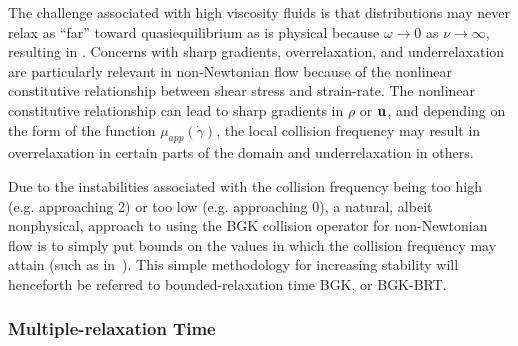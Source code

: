 The challenge associated with high viscosity fluids is that \DIFdelbegin {}\DIFdelend \DIFaddbegin {}\DIFaddend distributions may never relax as ``far'' toward quasiequilibrium as is physical because $\omega \rightarrow 0$ as $\nu \rightarrow \infty$, resulting in \DIFdelbegin {}\DIFdelend \DIFaddbegin {}\DIFaddend .
Concerns with sharp gradients, overrelaxation, and underrelaxation are particularly relevant in non-Newtonian flow because of the nonlinear constitutive relationship between shear stress and strain-rate.
The nonlinear constitutive relationship can lead to sharp gradients in $\rho$ or $\mathbf{u}$, and depending on the form of the function $\mu_{app}(\dot{\gamma})$, the local collision frequency may result in overrelaxation in certain parts of the domain and \DIFdelbegin {}\DIFdelend underrelaxation in others.

Due to the instabilities associated with the collision frequency being too high (e.g. approaching 2) or too low (e.g. approaching 0), a natural, albeit nonphysical, approach to using the BGK collision operator for non-Newtonian flow is to simply put bounds on the values in which the collision frequency may attain (such as in~\citet{svec2011flow,svec2012free,gabbanelli2005lattice}).
This simple methodology for increasing stability will henceforth be referred to bounded-relaxation time BGK, or BGK-BRT.

\subsubsection{Multiple-relaxation Time} \label{sec:mrt}

